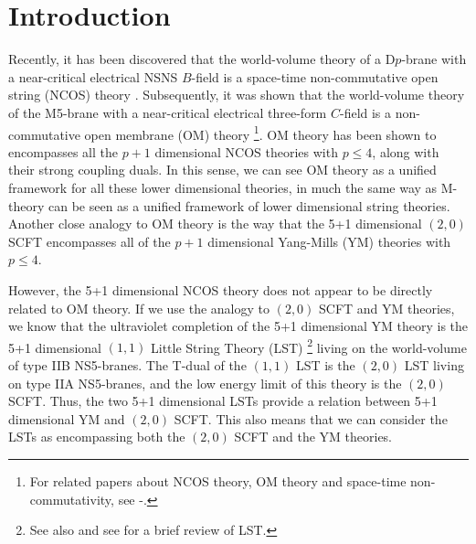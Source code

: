 \documentclass[a4paper,twoside,titlepage,12pt]{article}
\begin{document}
\newcommand{\ym}{${\rm YM}_{4+1}$}
\newcommand{\ymm}{${\rm YM}_{5+1}$}
\newcommand{\ncos}{${\rm NCOS}_{4+1}$}
\newcommand{\ncoss}{${\rm NCOS}_{5+1}$}



\setcounter{page}{1}

\tableofcontents

\section{Introduction}


Recently, it has been discovered that the world-volume theory of
a D$p$-brane with a near-critical electrical NSNS $B$-field is a space-time
non-commutative open string (NCOS) theory 
\cite{Seiberg:2000ms,Gopakumar:2000na}. 
Subsequently, it was shown that the world-volume theory of the
M5-brane with a near-critical electrical three-form $C$-field is
a non-commutative open membrane (OM) theory 
\cite{Gopakumar:2000ep,Bergshoeff:2000ai}%
\footnote{For related papers about NCOS theory, OM theory and
space-time non-commutativity, see 
\cite{Seiberg:2000gc}-\cite{Cai:2000yk}.}.
OM theory has been shown 
\cite{Gopakumar:2000ep,Bergshoeff:2000ai,Kawano:2000gn} 
to encompasses all the $p+1$ dimensional
NCOS theories with $p \leq 4$, along with their strong coupling
duals. In this sense, we can see OM theory as a unified framework
for all these lower dimensional theories, in much the same way
as M-theory can be seen as a unified framework of lower dimensional
string theories.
Another close analogy to OM theory is the way that the 5+1 dimensional
$(2,0)$ SCFT encompasses all of the $p+1$ dimensional Yang-Mills (YM) 
theories with $p \leq 4$.

However, the 5+1 dimensional NCOS theory does not appear to be directly
related to OM theory. 
If we use the analogy to $(2,0)$ SCFT and YM theories, we know
that the ultraviolet completion of the 5+1 dimensional YM theory 
is the 5+1 dimensional $(1,1)$ Little String Theory (LST) 
\cite{Berkooz:1997cq,Seiberg:1997zk}%
\footnote{See also \cite{Dijkgraaf:1997hk,Dijkgraaf:1997nb,Losev:1997hx} and 
see \cite{Aharony:1999ks} for a brief review of LST.}
living on the world-volume of type IIB NS5-branes. 
The T-dual of the $(1,1)$ LST is the $(2,0)$ LST living on type IIA 
NS5-branes, and the low energy limit of this theory is the 
$(2,0)$ SCFT. Thus, the two 5+1 dimensional LSTs provide a relation
between 5+1 dimensional YM and $(2,0)$ SCFT.
This also means that we can consider the LSTs as encompassing
both the $(2,0)$ SCFT and the YM theories.
\end{document}

